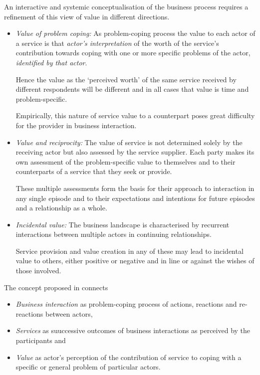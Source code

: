 \documentclass[11pt,a4paper]{article}
\begin{document}
An interactive and systemic conceptualisation of the business process requires
a refinement of this view of value in different directions.
\begin{itemize}
\item \emph{Value of problem coping:} As problem-coping process the value to
  each actor of a service is that \emph{actor's interpretation} of the worth
  of the service's contribution towards coping with one or more speciﬁc
  problems of the actor, \emph{identiﬁed by that actor}.

  Hence the value as the ‘perceived worth’ of the same service received by
  different respondents will be different and in all cases that value is time
  and problem-speciﬁc.

  Empirically, this nature of service value to a counterpart poses great
  difficulty for the provider in business interaction.

\item \emph{Value and reciprocity:} The value of service is not determined
  solely by the receiving actor but also assessed by the service supplier.
  Each party makes its own assessment of the problem-speciﬁc value to
  themselves and to their counterparts of a service that they seek or provide.

  These multiple assessments form the basis for their approach to interaction
  in any single episode and to their expectations and intentions for future
  episodes and a relationship as a whole.

\item \emph{Incidental value:} The business landscape is characterised by
  recurrent interactions between multiple actors in continuing relationships.

  Service provision and value creation in any of these may lead to incidental
  value to others, either positive or negative and in line or against the
  wishes of those involved.
\end{itemize}

The concept proposed in \cite{FordMouzas2013} connects
\begin{itemize}
\item \emph{Business interaction} as problem-coping process of actions,
  reactions and re-reactions between actors,
\item \emph{Services} as suuccessive outcomes of business interactions as
  perceived by the participants and
\item \emph{Value} as actor's perception of the contribution of service to
  coping with a specific or general problem of particular actors.
\end{itemize}
\end{document}
